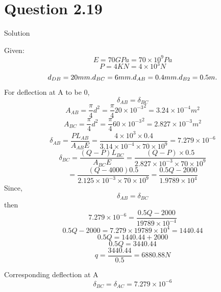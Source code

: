 \documentclass{article}
\begin{document}
\section*{Question 2.19}
\begin{center} Solution\end{center}
Given: 
\[E = 70GPa = 70 \times 10^{9}Pa\]
\[P = 4KN = 4 \times 10^{3}N\]
\[d_{DB} = 20mm. \space \space d_{BC} = 6mm. \space \space d_{AB} = 0.4mm. \space \space d_{B2} = 0.5m. \space \space\]
For deflection at A to be 0,\[\delta_{AB} = \delta_{BC}\]
\[A_{AB} = \frac{\pi}{4}d^{2} = \frac{\pi}{4}{20\times 10^{-3}}^2 = 3.24  \times 10^{-4}m^{2}\]
\[A_{BC} = \frac{\pi}{4}d^{2} = \frac{\pi}{4}{60\times 10^{-3}}^2 = 2.827  \times 10^{-3}m^{2}\]
\[\delta_{AB} = \frac{PL_{AB}}{A_{AB}E} = \frac{4\times 10^{3} \times 0.4}{3.14 \times 10^{-4} \times 70 \times 10^{9}}= 7.279\times10^{-6} \]
\[\delta_{BC} = \frac{(Q-P)L_{BC}}{A_{BC}E} = \frac{(Q-P) \times 0.5}{2.827 \times 10^{-3} \times 70 \times 10^{9}}\]
\[=\frac{(Q-4000)0.5}{2.125 \times 10^{-3}\times 70 \times 10^{9}} = \frac{0.5Q - 2000}{1.9789 \times10^{4}}\]
Since, \[\delta_{AB} = \delta_{BC}\]
then\[7.279\times10^{-6} = \frac{0.5Q - 2000}{19789 \times 10^{-4}}\]
\[0.5Q - 2000 = 7.279\times19789\times10^{4} = 1440.44\]
\[0.5Q= 1440.44+2000\]
\[0.5Q = 3440.44\]
\[q = \frac{3440.44}{0.5} = 6880.88N\]

Corresponding deflection at A
\[\delta_{BC} = \delta_{AC}= 7.279\times10^{-6}\]




\end{document}
